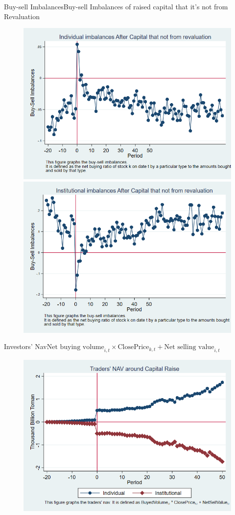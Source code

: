\documentclass{beamer}
\begin{document}
	\begin{frame}{Buy-sell Imbalances}{Buy-sell Imbalances of raised capital that it's not from Revaluation}
		\begin{figure}
			\centering
			\includegraphics[width=0.45\linewidth]{Output/IndImb_NoRevaluation.png}
			\includegraphics[width=0.45\linewidth]{Output/InsImb_NoRevaluation.png}
			\label{fig:indimbnorevaluation}
		\end{figure}
	\end{frame}
	
	\begin{frame}{Investors' Nav}{$ \text{Net buying volume}_{i,t} \times \text{ClosePrice}_{k,t} + \text{Net selling value}_{i,t} $}
		\begin{figure}
			\centering
			\includegraphics[width=0.65\linewidth]{Output/IndInsNav.png}
			\label{fig:IndInsNav}
		\end{figure}
	\end{frame}
\end{document}
